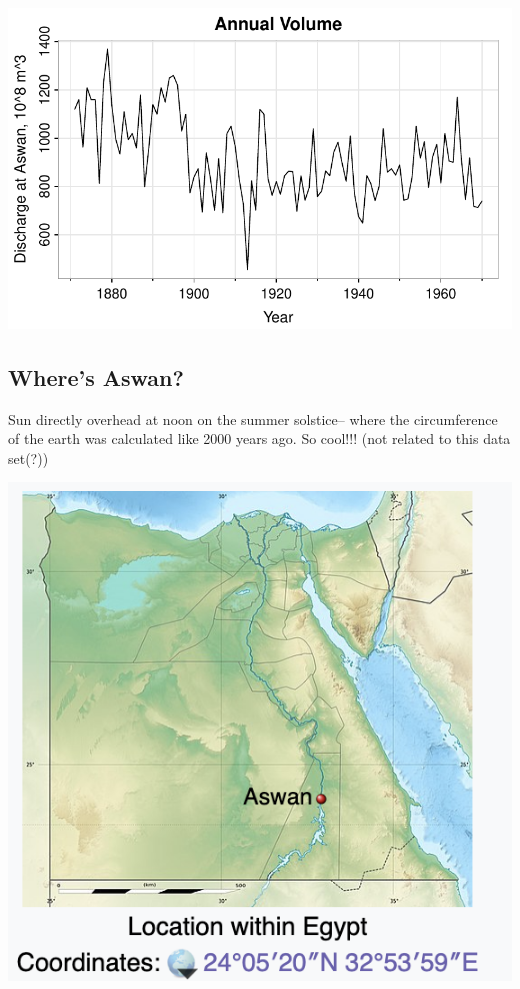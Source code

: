\documentclass[
  letterpaper,
  DIV=11,
  numbers=noendperiod]{scrartcl}
\begin{document}
\includegraphics{Lecture7_files/figure-pdf/unnamed-chunk-25-1.pdf}

\subsection{Where's Aswan?}\label{wheres-aswan}

Sun directly overhead at noon on the summer solstice-- where the
circumference of the earth was calculated like 2000 years ago. So
cool!!! (not related to this data set(?))

\includegraphics{images/Egypt map.png}
\end{document}
